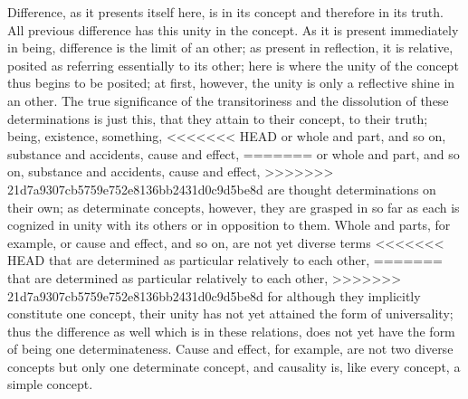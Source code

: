 Difference, as it presents itself here,
is in its concept and therefore in its truth.
All previous difference has this unity in the concept.
As it is present immediately in being,
difference is the limit of an other;
as present in reflection, it is relative,
posited as referring essentially to its other;
here is where the unity of the concept
thus begins to be posited;
at first, however, the unity is only
a reflective shine in an other.
The true significance of the transitoriness
and the dissolution of these determinations is just this,
that they attain to their concept, to their truth;
being, existence, something,
<<<<<<< HEAD
or whole and part, and so on, 
substance and accidents, cause and effect, 
=======
or whole and part, and so on,
substance and accidents, cause and effect,
>>>>>>> 21d7a9307cb5759e752e8136bb2431d0c9d5be8d
are thought determinations on their own;
as determinate concepts, however,
they are grasped in so far as each
is cognized in unity with its others
or in opposition to them.
Whole and parts, for example,
or cause and effect, and so on,
are not yet diverse terms
<<<<<<< HEAD
that are determined as particular 
relatively to each other, 
=======
that are determined as particular
relatively to each other,
>>>>>>> 21d7a9307cb5759e752e8136bb2431d0c9d5be8d
for although they implicitly constitute one concept,
their unity has not yet attained the form of universality;
thus the difference as well which is in these relations,
does not yet have the form of being one determinateness.
Cause and effect, for example, are not two diverse concepts
but only one determinate concept,
and causality is, like every concept,
a simple concept.

